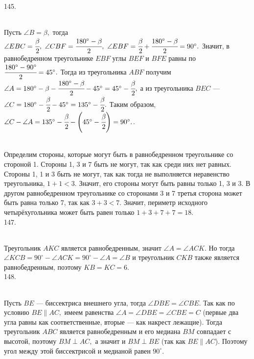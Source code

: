 145. \begin{figure}[ht!]
\end{figure}\\
Пусть $\angle B=\beta,$ тогда $\angle EBC=\cfrac{\beta}{2},\ \angle CBF=\cfrac{180^\circ-\beta}{2},\ \angle EBF=\cfrac{\beta}{2}+\cfrac{180^\circ-\beta}{2}=90^\circ.$ Значит, в равнобедренном треугольнике $EBF$ углы $BEF$ и $BFE$ равны по $\cfrac{180^\circ-90^\circ}{2}=45^\circ.$ Тогда из треугольника $ABF$ получим $\angle A=180^\circ-\beta-\cfrac{180^\circ-\beta}{2}-45^\circ=45^\circ-\cfrac{\beta}{2},$ а из треугольника $BEC$ --- $\angle C=180^\circ-\cfrac{\beta}{2}-45^\circ=135^\circ-\cfrac{\beta}{2}.$ Таким образом, $\angle C-\angle A=135^\circ-\cfrac{\beta}{2} -\left(45^\circ-\cfrac{\beta}{2}\right)=90^\circ.$\newpage{}. \begin{figure}[ht!]
\end{figure}\\
Определим стороны, которые могут быть в равнобедренном треугольнике со стороной 1. Стороны 1, 3 и 7 быть не могут, так как среди них нет равных. Стороны 1, 1 и 3 быть не могут, так как тогда не выполняется неравенство треугольника,  $1+1<3.$ Значит, его стороны могут быть равны только 1, 3 и 3. В другом равнобедренном треугольнике со сторонами 3 и 7 третья сторона может быть равна только 7, так как $3+3<7.$ Значит, периметр исходного четырёхугольника может быть равен только $1+3+7+7=18.$\\
147. \begin{figure}[ht!]
\end{figure}\\
Треугольник $AKC$ является равнобедренным, значит $\angle A=\angle ACK.$ Но тогда $\angle KCB=90^\circ-\angle ACK=90^\circ-\angle A=\angle B$ и треугольник $CKB$ также является равнобедренным, поэтому $KB=KC=6.$\\
148. \begin{figure}[ht!]
\end{figure}\\
Пусть $BE$ --- биссектриса внешнего угла, тогда $\angle DBE=\angle CBE.$ Так как по условию $BE\parallel AC,$ имеем равенства $\angle A=\angle DBE=\angle CBE=C$ (первые два угла равны как соответственные, вторые --- как накрест лежащие). Тогда треугольник $ABC$ является равнобедренным и его медиана $BM$ совпадает с высотой, поэтому $BM\perp AC,$ а значит и $BM\perp BE$ (так как $BE\parallel AC$). Поэтому угол между этой биссектрисой и медианой равен $90^\circ.$\newpage\noindent
